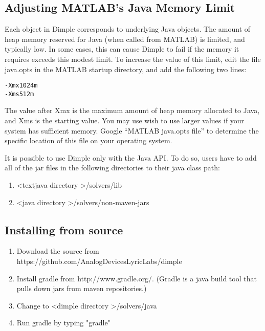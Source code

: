 \subsection{Adjusting MATLAB's Java Memory Limit}

Each object in Dimple corresponds to underlying Java objects. The amount of heap memory reserved for Java (when called from MATLAB) is limited, and typically low.  In some cases, this can cause Dimple to fail if the memory it requires exceeds this modest limit.  To increase the value of this limit, edit the file java.opts in the MATLAB startup directory, and add the following two lines:

\begin{lstlisting}
-Xmx1024m
-Xms512m
\end{lstlisting}

The value after Xmx is the maximum amount of heap memory allocated to Java, and Xms is the starting value.  You may use wish to use larger values if your system has sufficient memory.  Google ``MATLAB java.opts file'' to determine the specific location of this file on your operating system.



\fi

\ifjava

It is possible to use Dimple only with the Java API.  To do so, users have to add all of the jar files in the following directories to their java class path:

\begin{enumerate}
\item \textless textjava directory \textgreater /solvers/lib
\item \textless java directory \textgreater /solvers/non-maven-jars
\end{enumerate}

\fi

\subsection{Installing from source}

\begin{enumerate}
\item Download the source from https://github.com/AnalogDevicesLyricLabs/dimple
\item Install gradle from http://www.gradle.org/.  (Gradle is a java build tool that pulls down jars from maven repositories.)
\item Change to \textless dimple directory \textgreater /solvers/java 
\item Run gradle by typing "gradle"
\end{enumerate}

